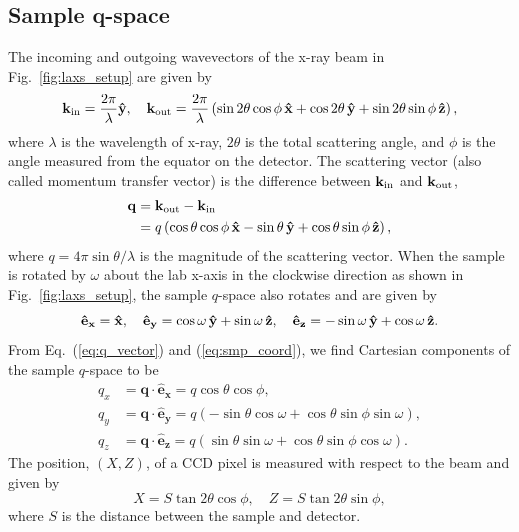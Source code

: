\subsection{Sample q-space}\label{sec:sample_q-space}
The incoming and outgoing wavevectors of the x-ray beam in Fig.~\ref{fig:laxs_setup}
are given by
\begin{equation}
  \mathbf{k}_{\mathrm{in}} = \frac{2\pi}{\lambda} \mathbf{\hat{y}}, \quad
  \mathbf{k}_{\mathrm{out}} = 
    \frac{2\pi}{\lambda} \left( 
      \sin 2\theta \cos\phi \, \mathbf{\hat{x}}
      + \cos 2\theta \, \mathbf{\hat{y}}
      + \sin 2\theta \sin\phi \, \mathbf{\hat{z}} 
    \right),
\end{equation}
where $\lambda$ is the wavelength of x-ray, $2\theta$ is the total scattering
angle, and $\phi$ is the angle measured from the equator on the detector. 
The scattering vector (also called
momentum transfer vector) is
the difference between $\mathbf{k}_{\mathrm{in}}$ and $\mathbf{k}_{\mathrm{out}}$,
\begin{align}
  \mathbf{q} &= \mathbf{k}_{\mathrm{out}} - \mathbf{k}_{\mathrm{in}} \nonumber \\
             &= q \left( 
                  \cos\theta\cos\phi \, \mathbf{\hat{x}} - \sin\theta \, \mathbf{\hat{y}}
                  + \cos\theta\sin\phi \, \mathbf{\hat{z}}
                \right),
  \label{eq:q_vector}
\end{align}
where $q=4\pi\sin\theta/\lambda$ is the magnitude of the scattering vector. 
When the sample is rotated by $\omega$ about the lab x-axis in the clockwise 
direction as shown in Fig.~\ref{fig:laxs_setup}, the sample $q$-space also rotates and 
are given by  
\begin{equation}
  \mathbf{\hat{e}_x} = \mathbf{\hat{x}}, \quad
  \mathbf{\hat{e}_y} = \cos\omega\,\mathbf{\hat{y}} + \sin\omega\,\mathbf{\hat{z}}, \quad
  \mathbf{\hat{e}_z} = -\sin\omega\,\mathbf{\hat{y}} + \cos\omega\,\mathbf{\hat{z}}.
  \label{eq:smp_coord}
\end{equation}
From Eq.~(\ref{eq:q_vector}) and (\ref{eq:smp_coord}), we find Cartesian
components of the sample $q$-space to be
\begin{align}
  q_x &= \mathbf{q}\cdot\mathbf{\hat{e}_x} 
       = q\cos\theta\cos\phi, 
       \nonumber\\
  q_y &= \mathbf{q}\cdot\mathbf{\hat{e}_y} 
       = q\left(-\sin\theta\cos\omega + \cos\theta\sin\phi\sin\omega\right), 
       \nonumber\\
  q_z &= \mathbf{q}\cdot\mathbf{\hat{e}_z} 
       = q\left(\sin\theta\sin\omega + \cos\theta\sin\phi\cos\omega\right).
       \label{eq:qxqyqz}
\end{align}
The position, $(X,Z)$, of a CCD pixel is measured with respect to the beam 
and given by
\begin{equation}
  X = S \tan 2\theta \cos\phi, \quad Z = S \tan 2\theta \sin\phi,
  \label{eq:XZ}
\end{equation} 
where $S$ is the distance between the sample and detector.

